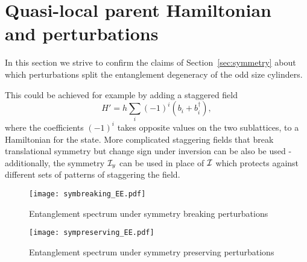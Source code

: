 
\section{Quasi-local parent Hamiltonian and perturbations}
\label{sec:perturbations}

In this section we strive to confirm the claims of Section~\ref{sec:symmetry} about
which perturbations split the entanglement degeneracy of the odd size cylinders.

This could be achieved for example by adding a staggered field 
$$
H' = h \sum\limits_{i} (-1)^i \left(b_i + b_i^{\dagger}\right),
$$
where the coefficients $(-1)^i$ takes opposite values on the two sublattices, 
to a Hamiltonian for the state. More complicated staggering fields that break translational 
symmetry but change sign under inversion can be also be used - additionally, the symmetry $\mathcal{I}_y$ 
can be used in place of $\mathcal{I}$ which protects against different sets of patterns of staggering the 
field.

\begin{figure}[htbp]
	\centering
		\texttt{[image: symbreaking\_EE.pdf]}
	\caption{Entanglement spectrum under symmetry breaking perturbations}
	\label{fig:symbreaking_EE}
\end{figure}

\begin{figure}[htbp]
	\centering
		\texttt{[image: sympreserving\_EE.pdf]}
	\caption{Entanglement spectrum under symmetry preserving perturbations}
	\label{fig:symbreaking_EE}
\end{figure}

